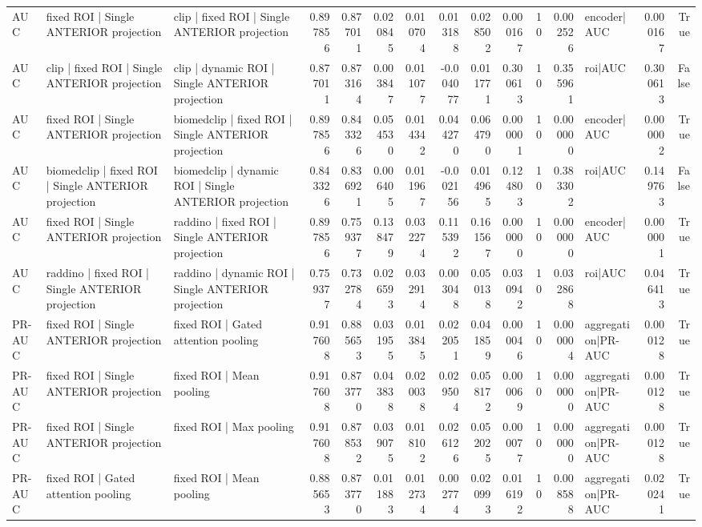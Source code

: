 \begin{table}
\begin{tabular}{lllrrrrrrrrrlrr}
AUC & fixed ROI | Single ANTERIOR projection & clip | fixed ROI | Single ANTERIOR projection & 0.897856 & 0.877011 & 0.020845 & 0.010704 & 0.013188 & 0.028502 & 0.000167 & 10 & 0.002526 & encoder|AUC & 0.000167 & True \\
AUC & clip | fixed ROI | Single ANTERIOR projection & clip | dynamic ROI | Single ANTERIOR projection & 0.877011 & 0.873164 & 0.003847 & 0.011077 & -0.004077 & 0.011771 & 0.300613 & 10 & 0.355961 & roi|AUC & 0.300613 & False \\
AUC & fixed ROI | Single ANTERIOR projection & biomedclip | fixed ROI | Single ANTERIOR projection & 0.897856 & 0.843326 & 0.054530 & 0.014342 & 0.044270 & 0.064790 & 0.000001 & 10 & 0.000000 & encoder|AUC & 0.000002 & True \\
AUC & biomedclip | fixed ROI | Single ANTERIOR projection & biomedclip | dynamic ROI | Single ANTERIOR projection & 0.843326 & 0.836921 & 0.006405 & 0.011967 & -0.002156 & 0.014965 & 0.124803 & 10 & 0.383302 & roi|AUC & 0.149763 & False \\
AUC & fixed ROI | Single ANTERIOR projection & raddino | fixed ROI | Single ANTERIOR projection & 0.897856 & 0.759377 & 0.138479 & 0.032274 & 0.115392 & 0.161567 & 0.000000 & 10 & 0.000000 & encoder|AUC & 0.000001 & True \\
AUC & raddino | fixed ROI | Single ANTERIOR projection & raddino | dynamic ROI | Single ANTERIOR projection & 0.759377 & 0.732784 & 0.026593 & 0.032914 & 0.003048 & 0.050138 & 0.030942 & 10 & 0.032868 & roi|AUC & 0.046413 & True \\
PR-AUC & fixed ROI | Single ANTERIOR projection & fixed ROI | Gated attention pooling & 0.917608 & 0.885653 & 0.031955 & 0.013845 & 0.022051 & 0.041859 & 0.000046 & 10 & 0.000004 & aggregation|PR-AUC & 0.000128 & True \\
PR-AUC & fixed ROI | Single ANTERIOR projection & fixed ROI | Mean pooling & 0.917608 & 0.873770 & 0.043838 & 0.020038 & 0.029504 & 0.058172 & 0.000069 & 10 & 0.000000 & aggregation|PR-AUC & 0.000128 & True \\
PR-AUC & fixed ROI | Single ANTERIOR projection & fixed ROI | Max pooling & 0.917608 & 0.878532 & 0.039075 & 0.018102 & 0.026126 & 0.052025 & 0.000077 & 10 & 0.000000 & aggregation|PR-AUC & 0.000128 & True \\
PR-AUC & fixed ROI | Gated attention pooling & fixed ROI | Mean pooling & 0.885653 & 0.873770 & 0.011883 & 0.012734 & 0.002774 & 0.020993 & 0.016192 & 10 & 0.008588 & aggregation|PR-AUC & 0.020241 & True \\

\end{tabular}
\end{table}
